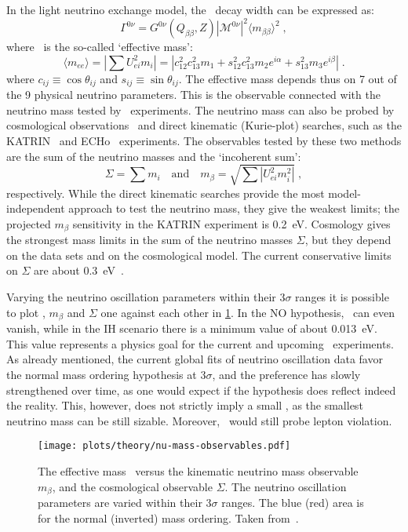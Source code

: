 In the light neutrino exchange model, the \onbb\ decay width can be expressed as:
\[
  \Gamma^{0\nu} = G^{0\nu}(Q_{\beta\beta}, Z)
                  |\mathcal{M}^{0\nu}|^2
                  \langle{m_{\beta\beta}}\rangle^2 \;,
\]
where \mbb\ is the so-called `effective mass':
\[
  \langle m_{ee} \rangle = \left| \sum U_{ei}^2 m_i \right|
                         = |c^2_{12} c^2_{13} m_1 + s^2_{12} c^2_{13} m_2 e^{i\alpha}
                            + s^2_{13} m_3 e^{i\beta}| \;.
\]
where $c_{ij} \equiv \cos{\theta_{ij}}$ and $s_{ij} \equiv \sin{\theta_{ij}}$.
The effective mass depends thus on 7 out of the 9 physical neutrino parameters.
This is the observable connected with the neutrino mass tested by \onbb\
experiments.  The neutrino mass can also be probed by cosmological
observations~\cite{Gerbino2018} and direct kinematic (Kurie-plot) searches,
such as the KATRIN~\cite{Aker2019} and ECHo~\cite{Gastaldo2018} experiments.
The observables tested by these two methods are the sum of the neutrino masses
and the `incoherent sum':
\[
  \Sigma = \sum m_i \quad \text{and} \quad m_\beta
         = \sqrt{\sum |U_{ei}^2 m_i^2|} \;,
\]
respectively. While the direct kinematic searches provide the most
model-independent approach to test the neutrino mass, they give the weakest
limits; the projected $m_\beta$ sensitivity in the KATRIN experiment is 0.2~eV.
Cosmology gives the strongest mass limits in the sum of the neutrino masses
$\Sigma$, but they depend on the data sets and on the cosmological model. The
current conservative limits on $\Sigma$ are about 0.3~eV~\cite{Aghanim2018}.

Varying the neutrino oscillation parameters within their $3\sigma$ ranges it is
possible to plot \mbb, $m_\beta$ and $\Sigma$ one against each other in
\cref{fig:nbb:mass-obs}. In the NO hypothesis, \mbb\ can even vanish, while
in the IH scenario there is a minimum value of about 0.013~eV. This value
represents a physics goal for the current and upcoming \onbb\ experiments.
As already mentioned, the current global fits of neutrino oscillation data
favor the normal mass ordering hypothesis at $3\sigma$, and the preference
has slowly strengthened over time, as one would expect if the hypothesis does
reflect indeed the reality. This, however, does not strictly imply a small
\mbb, as the smallest neutrino mass can be still sizable. Moreover, \onbb\
would still probe lepton violation.

\begin{figure}
  \centering
  \texttt{[image: plots/theory/nu-mass-observables.pdf]}
  \caption{%
    The effective mass \mbb\ versus the kinematic neutrino mass observable
    $m_\beta$, and the cosmological observable $\Sigma$. The neutrino
    oscillation parameters are varied within their $3\sigma$ ranges. The blue
    (red) area is for the normal (inverted) mass ordering. Taken
    from~\cite{Dolinski2019}.
  }\label{fig:nbb:mass-obs}
\end{figure}

